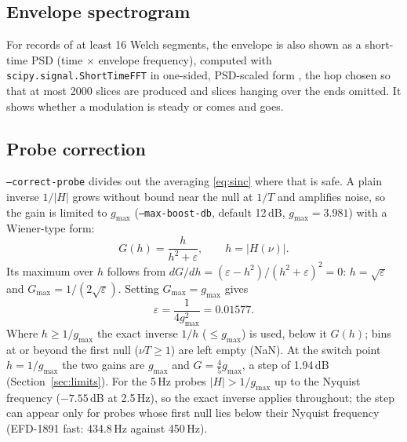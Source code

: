 \documentclass[10pt,letterpaper]{article}
\numberwithin{equation}{section}
\begin{document}
\subsection{Envelope spectrogram}
For records of at least 16 Welch segments, the envelope is also shown as a
short-time PSD (time $\times$ envelope frequency), computed with
\texttt{scipy.signal.ShortTimeFFT} in one-sided, PSD-scaled form \cite{B30}, the
hop chosen so that at most 2000 slices are produced and slices hanging over the
ends omitted. It shows whether a modulation is steady or comes and goes.

\subsection{Probe correction}\label{sec:correction}
\texttt{--correct-probe} divides out the averaging \eqref{eq:sinc} where that is
safe. A plain inverse $1/|H|$ grows without bound near the null at $1/T$ and
amplifies noise, so the gain is limited to $g_\mathrm{max}$ (\texttt{--max-boost-db},
default 12\,dB, $g_\mathrm{max} = 3.981$) with a Wiener-type form:
\begin{equation}
G(h) = \frac{h}{h^2 + \varepsilon},\qquad h = |H(\nu)|.
\end{equation}
Its maximum over $h$ follows from $dG/dh = (\varepsilon - h^2)/(h^2+\varepsilon)^2 = 0$:
$h = \sqrt{\varepsilon}$ and $G_\mathrm{max} = 1/(2\sqrt{\varepsilon})$. Setting
$G_\mathrm{max} = g_\mathrm{max}$ gives
\begin{equation}
\varepsilon = \frac{1}{4 g_\mathrm{max}^2} = 0.01577 .
\end{equation}
Where $h \ge 1/g_\mathrm{max}$ the exact inverse $1/h$ ($\le g_\mathrm{max}$) is
used, below it $G(h)$; bins at or beyond the first null ($\nu T \ge 1$) are left
empty (NaN). At the switch point $h = 1/g_\mathrm{max}$ the two gains are $g_\mathrm{max}$
and $G = \tfrac45 g_\mathrm{max}$, a step of 1.94\,dB
(Section~\ref{sec:limits}). For the 5\,Hz probes $|H| > 1/g_\mathrm{max}$ up to
the Nyquist frequency ($-7.55$\,dB at 2.5\,Hz), so the exact inverse
applies throughout; the step can appear only for probes whose first null lies
below their Nyquist frequency (EFD-1891 fast: 434.8\,Hz against
450\,Hz).
\end{document}
